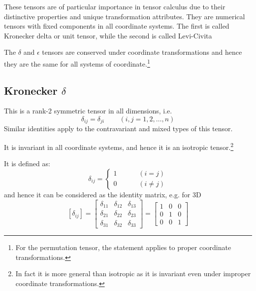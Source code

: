  These tensors are of particular importance in tensor calculus
due to their distinctive properties and unique transformation attributes.
They are numerical tensors with fixed components in all coordinate
systems. The first is called Kronecker delta or unit tensor, while
the second is called Levi-Civita

 The $\delta$ and $\epsilon$ tensors are conserved under
coordinate transformations and hence they are the same for all systems
of coordinate.\footnote{For the permutation tensor, the statement applies to proper coordinate
transformations.}


\subsection{Kronecker $\delta$\label{subKronecker}}

 This is a rank-2 symmetric tensor in all dimensions, i.e.
\begin{equation}
\delta_{ij}=\delta_{ji}\,\,\,\,\,\,\,\,\,\,\,\,\,\left(i,j=1,2,\ldots,n\right)
\end{equation}
Similar identities apply to the contravariant and mixed types of this
tensor.

 It is invariant in all coordinate systems, and hence it
is an isotropic tensor.\footnote{In fact it is more general than isotropic as it is invariant even
under improper coordinate transformations.}

 It is defined as:
\begin{equation}
\delta_{ij}=\begin{cases}
1 & (i=j)\\
0\,\,\,\,\,\,\,\,\,\,\,\,\,\, & (i\neq j)
\end{cases}\label{eqKroneckerDefinitionNormal}
\end{equation}
and hence it can be considered as the identity matrix, e.g. for 3D
\begin{equation}
\left[\delta_{ij}\right]=\left[\begin{array}{ccc}
\delta_{11} & \delta_{12} & \delta_{13}\\
\delta_{21} & \delta_{22} & \delta_{23}\\
\delta_{31} & \delta_{32} & \delta_{33}
\end{array}\right]=\left[\begin{array}{ccc}
1 & 0 & 0\\
0 & 1 & 0\\
0 & 0 & 1
\end{array}\right]
\end{equation}


